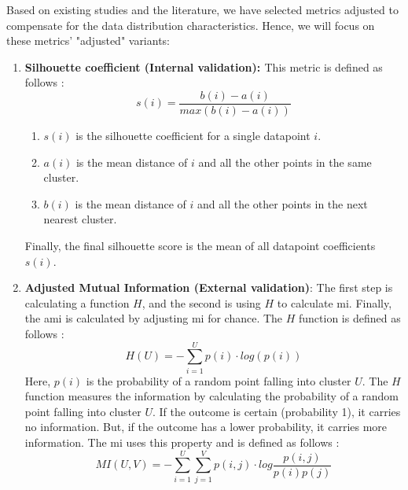 Based on existing studies and the literature, we have selected metrics adjusted to compensate for the data distribution characteristics.
Hence, we will focus on these metrics' "adjusted" variants:
\begin{enumerate}
  \item \textbf{Silhouette coefficient (Internal validation): \label{eq:silhouette_coefficient}}
        This metric is defined as follows \citep{liu_understanding_2010,rousseeuw_silhouettes_1987}:
        \begin{equation}
          s(i) = \frac{b(i) - a(i)}{max(b(i) - a(i))}
        \end{equation}
        \begin{enumerate}
          \item $s(i)$ is the silhouette coefficient for a single datapoint $i$.
          \item $a(i)$ is the mean distance of $i$ and all the other points in the same cluster.
          \item $b(i)$ is the mean distance of $i$ and all the other points in the next nearest cluster.
        \end{enumerate}
        Finally, the final silhouette score is the mean of all datapoint coefficients $s(i)$.
  \item \textbf{Adjusted Mutual Information (External validation)}:
        The first step is calculating a function $H$, and the second is using $H$ to calculate \gls{mi}.
        Finally, the \gls{ami} is calculated by adjusting \gls{mi} for chance. \newline
        The $H$ function is defined as follows \citep{vinh_information_nodate}:
        \begin{equation}
          H(U) = - \sum_{i=1}^{U} p(i) \cdot log (p(i))
        \end{equation}
        Here, $p(i)$ is the probability of a random point falling into cluster $U$.
        The $H$ function measures the information by calculating the probability of a random point falling into cluster $U$.
        If the outcome is certain (probability 1), it carries no information.
        But, if the outcome has a lower probability, it carries more information.
        The \gls{mi} uses this property and is defined as follows \citep{vinh_information_nodate}:
        \begin{equation}
          MI(U, V) = - \sum_{i=1}^{U} \sum_{j=1}^{V} p(i,j) \cdot log \frac{p(i,j)}{p(i)p(j)}

\end{equation}
\end{enumerate}
